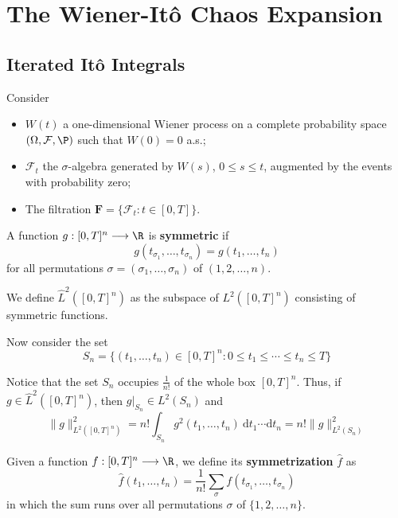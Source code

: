 \chapter{The Wiener-Itô Chaos Expansion}

\section{Iterated Itô Integrals}

Consider

\begin{itemize}
\item
  \(W(t)\) a one-dimensional Wiener process on a complete probability
  space \((\Omega, \mathcal{F}, \P)\) such that \(W(0) = 0\)
  a.s.;
\item
  \(\mathcal{F}_t\) the \(\sigma\)-algebra generated by \(W(s)\),
  \(0 \le s \le t\), augmented by the events with probability zero;
\item
  The filtration \(\mathbf{F} = \{ \mathcal{F}_t : t \in [0, T] \}\).
\end{itemize}

\begin{definition}
    A function \(g : [0,T]^n \longrightarrow \R\) is \textbf{symmetric} if
    \[
    g(t_{\sigma_1}, \ldots, t_{\sigma_n}) = g(t_1, \ldots, t_n)
    \]
    for all permutations \(\sigma = (\sigma_1, \ldots, \sigma_n)\) of
    \((1, 2, \ldots, n)\).

    We define \(\hat{L}^2([0,T]^n)\) as the subspace of \(L^2([0,T]^n)\)
    consisting of symmetric functions.
\end{definition}

Now consider the set
\[
S_n = \{ (t_1, \ldots, t_n) \in [0, T]^n : 0 \le t_1 \le \cdots \le t_n \le T \}
\]

Notice that the set \(S_n\) occupies \(\frac{1}{n!}\) of the whole box
\([0,T]^n\). Thus, if \(g \in \hat{L}^2([0,T]^n)\), then
\(g|_{S_n} \in L^2(S_n)\) and
\[
\| g \|_{L^2([0,T]^n)}^2 = n! \int_{S_n} g^2(t_1, \ldots, t_n) ~\mathrm{d} t_1 \cdots \mathrm{d}t_n = n! \| g \|_{L^2(S_n)}^2
\]

\begin{definition}
    Given a function \(f : [0,T]^n \longrightarrow \R\), we define its
    \textbf{symmetrization} \(\hat{f}\) as
    \[
    \hat{f}(t_1, \ldots, t_n) = \frac{1}{n!} \sum_{\sigma} f(t_{\sigma_1}, \ldots, t_{\sigma_n})
    \]
    in which the sum runs over all permutations \(\sigma\) of \(\{ 1, 2, \ldots, n \}\).
\end{definition}

